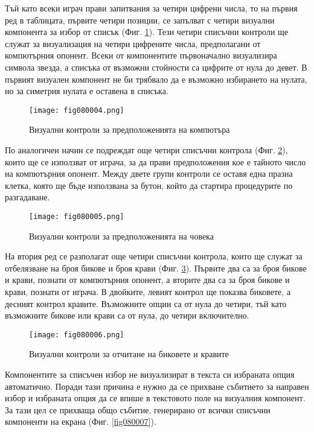 Тъй като всеки играч прави запитвания за четири цифрени числа, то на първия ред в таблицата, първите четири позиции, се запълват с четири визуални компонента за избор от списък (Фиг. \ref{fig080004}). Тези четири списъчни контроли ще служат за визуализация на четири цифрените числа, предполагани от компютърния опонент. Всеки от компонентите първоначално визуализира символа звезда, а списъка от възможни стойности са цифрите от нула до девет. В първият визуален компонент не би трябвало да е възможно избирането на нулата, но за симетрия нулата е оставена в списъка. 

\begin{figure}[H]
  \centering
  \texttt{[image: fig080004.png]}
  \caption{Визуални контроли за предположенията на компютъра}
\label{fig080004}
\end{figure}

По аналогичен начин се подреждат още четири списъчни контрола (Фиг. \ref{fig080005}), които ще се използват от играча, за да прави предположения кое е тайното число на компютърния опонент. Между двете групи контроли се оставя една празна клетка, която ще бъде използвана за бутон, който да стартира процедурите по разгадаване. 

\begin{figure}[H]
  \centering
  \texttt{[image: fig080005.png]}
  \caption{Визуални контроли за предположенията на човека}
\label{fig080005}
\end{figure}

На втория ред се разполагат още четири списъчни контрола, които ще служат за отбелязване на броя бикове и броя крави (Фиг. \ref{fig080006}). Първите два са за броя бикове и крави, познати от компютърния опонент, а вторите два са за броя бикове и крави, познати от играча. В двойките, левият контрол ще показва биковете, а десният контрол кравите. Възможните опции са от нула до четири, тъй като възможните бикове или крави са от нула, до четири включително.

\begin{figure}[H]
  \centering
  \texttt{[image: fig080006.png]}
  \caption{Визуални контроли за отчитане на биковете и кравите}
\label{fig080006}
\end{figure}

Компонентите за списъчен избор не визуализират в текста си избраната опция автоматично. Поради тази причина е нужно да се прихване събитието за направен избор и избраната опция да се впише в текстовото поле на визуалния компонент. За тази цел се прихваща общо събитие, генерирано от всички списъчни компоненти на екрана (Фиг. \ref{fig080007}).

